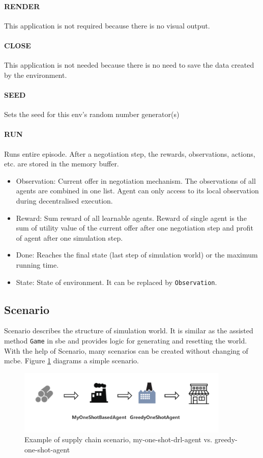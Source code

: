 \paragraph{RENDER} This application is not required because there is no visual output.
\paragraph{CLOSE} This application is not needed because there is no need to save the data created by
the environment.
\paragraph{SEED} Sets the seed for this env’s random number generator(s)
\paragraph{RUN} Runs entire episode. After a negotiation step, the rewards, observations, actions, etc. are stored in the memory buffer. 
\begin{itemize}
	\item Observation: Current offer in negotiation mechanism. The observations of all agents are combined in one list. Agent can only access to its local observation during decentralised execution.
	\item Reward: Sum reward of all learnable agents. Reward of single agent is the sum of utility value of the current offer after one negotiation step and profit of agent after one simulation step.
	\item Done: Reaches the final state (last step of simulation world) or the maximum running time.
	\item State: State of environment. It can be replaced by \texttt{Observation}.
\end{itemize}

\subsection{Scenario} \label{scenario}
Scenario describes the structure of simulation world. It is similar as the assisted method \texttt{Game} in \gls{sbe} and provides logic for generating and resetting the world. With the help of Scenario, many scenarios can be created without changing of \gls{mcbe}. Figure \ref{fig:supply-chain-scenario-1} diagrams a simple scenario.

\begin{figure}[htbp]
\centering
\includegraphics[width=0.9\textwidth]{./images/supply-chain-scenario-1.png}
\caption{Example of supply chain scenario, \gls{my-one-shot-drl-agent} vs. \gls{greedy-one-shot-agent}}
\label{fig:supply-chain-scenario-1}
\end{figure}

